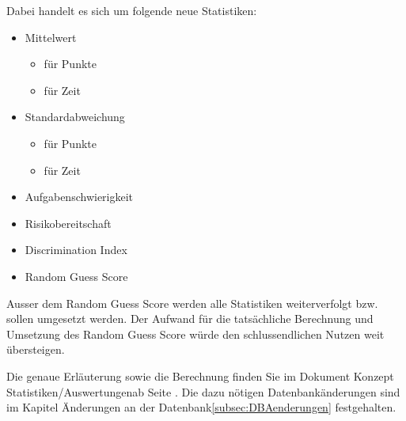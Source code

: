 \noindent Dabei handelt es sich um folgende neue Statistiken:
\begin{itemize}
	\item Mittelwert
	\begin{itemize}
		\item für Punkte
		\item für Zeit
	\end{itemize}
	\item Standardabweichung
	\begin{itemize}
		\item für Punkte
		\item für Zeit
	\end{itemize}
	\item Aufgabenschwierigkeit
	\item Risikobereitschaft
	\item Discrimination Index
	\item Random Guess Score
\end{itemize}

\noindent Ausser dem Random Guess Score werden alle Statistiken weiterverfolgt bzw. sollen umgesetzt werden. Der Aufwand für die tatsächliche Berechnung und Umsetzung des Random Guess Score würde den schlussendlichen Nutzen weit übersteigen.

\bigskip

Die genaue Erläuterung sowie die Berechnung finden Sie im Dokument \glqq Konzept Statistiken/Auswertungen\grqq ab Seite \hyperlink{page.\getpagerefnumber{pdf:konzeptStatistiken}}{}. Die dazu nötigen Datenbankänderungen sind im Kapitel \glqq Änderungen an der Datenbank\grqq \ref{subsec:DBAenderungen} festgehalten.